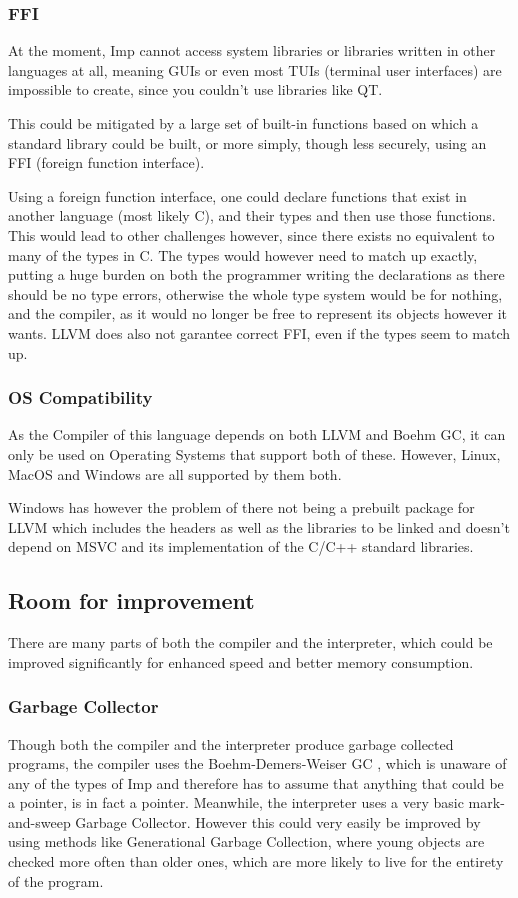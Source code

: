 \documentclass[12pt]{article}
\begin{document}
\subsubsection{FFI}
At the moment, Imp cannot access system libraries or libraries
written in other languages at all, meaning GUIs or even most TUIs
(terminal user interfaces) are impossible to create,
since you couldn't use libraries like QT.

This could be mitigated by a large set of built-in functions based
on which a standard library could be built, or more simply, though
less securely, using an FFI (foreign function interface).

Using a foreign function interface, one could declare functions that
exist in another language (most likely C), and their types and then use
those functions. This would lead to other challenges however, since
there exists no equivalent to many of the types in C.
The types would however need to match up exactly,
putting a huge burden on both the programmer writing the declarations
as there should be no type errors, otherwise the whole type system
would be for nothing, and the compiler, as it would no longer
be free to represent its objects however it wants.
LLVM does also not garantee correct FFI, even if the types
seem to match up.

\subsubsection{OS Compatibility}
As the Compiler of this language depends on both
LLVM and Boehm GC, it can only be used on Operating Systems
that support both of these. However, Linux, MacOS and Windows
are all supported by them both.

Windows has however the problem of there not being
a prebuilt package for LLVM which includes the headers as well
as the libraries to be linked and doesn't depend on MSVC and its
implementation of the C/C++ standard libraries.

\subsection{Room for improvement}
There are many parts of both the compiler and the
interpreter, which could be improved significantly
for enhanced speed and better memory consumption.

\subsubsection{Garbage Collector}
Though both the compiler and the interpreter produce
garbage collected programs, the compiler uses the
Boehm-Demers-Weiser GC \autocite{GarbageCollector},
which is unaware of any of the types of Imp and therefore
has to assume that anything that could be a pointer,
is in fact a pointer.
Meanwhile, the interpreter uses a very basic mark-and-sweep
Garbage Collector. However this could very easily be improved
by using methods like Generational Garbage Collection, where
young objects are checked more often than older ones, which are more
likely to live for the entirety of the program.
\end{document}
